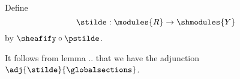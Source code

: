 \begin{definition}
Define
\[\stilde: \modules{R} \rightarrow \shmodules{Y}\]
by
$\sheafify \circ \pstilde$.

It follows from lemma .. %
that we have the adjunction $\adj{\stilde}{\globalsections}$.
\end{definition}














